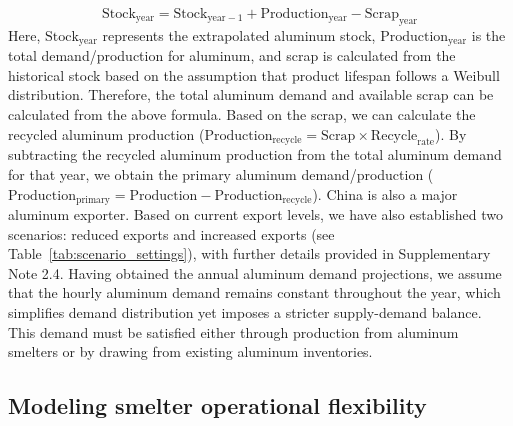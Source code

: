 \documentclass[preprint]{elsarticle}
\begin{document}
\begin{equation}
\label{eq_demand}
\text{Stock}_{\text{year}} = \text{Stock}_{\text{year}-1} + \text{Production}_{\text{year}} - \text{Scrap}_{\text{year}}
\end{equation}
Here, $\text{Stock}_{\text{year}}$ represents the extrapolated aluminum stock, $\text{Production}_{\text{year}}$ is the total demand/production for aluminum, and scrap is calculated from the historical stock based on the assumption that product lifespan follows a Weibull distribution. Therefore, the total aluminum demand and available scrap can be calculated from the above formula. Based on the scrap, we can calculate the recycled aluminum production ($\text{Production}_{\text{recycle}} = \text{Scrap} \times \text{Recycle}_{\text{rate}}$). By subtracting the recycled aluminum production from the total aluminum demand for that year, we obtain the primary aluminum demand/production ($\text{Production}_{\text{primary}} = \text{Production} - \text{Production}_{\text{recycle}}$). China is also a major aluminum exporter. Based on current export levels, we have also established two scenarios: reduced exports and increased exports (see Table~\ref{tab:scenario_settings}), with further details provided in Supplementary Note 2.4. Having obtained the annual aluminum demand projections, we assume that the hourly aluminum demand remains constant throughout the year, which simplifies demand distribution yet imposes a stricter supply-demand balance. This demand must be satisfied either through production from aluminum smelters or by drawing from existing aluminum inventories.

\subsection*{Modeling smelter operational flexibility}
\end{document}
